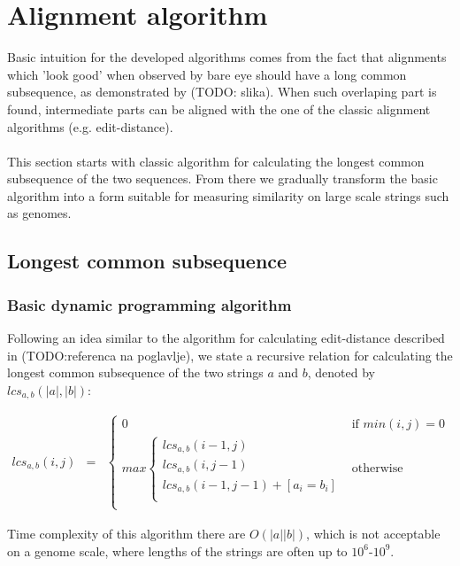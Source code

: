 \documentclass[times, utf8, diplomski]{fer}
\begin{document}
\section{Alignment algorithm}
Basic intuition for the developed algorithms comes from the fact that alignments which 'look good' when observed by bare eye should have a long common subsequence, as demonstrated by (TODO: slika). When such overlaping part is found, intermediate parts can be aligned with the one of the classic alignment algorithms (e.g. edit-distance).\\
\\
This section starts with classic algorithm for calculating the longest common subsequence of the two sequences. From there we gradually transform the basic algorithm into a form suitable for measuring similarity on large scale strings such as genomes.

\subsection{Longest common subsequence}

\subsubsection{Basic dynamic programming algorithm}

Following an idea similar to the algorithm for calculating edit-distance described in (TODO:referenca na poglavlje), we state a recursive relation for calculating the longest common subsequence of the two strings $a$ and $b$, denoted by $lcs_{a,b}(|a|,|b|)$:

\begin{eqnarray}
	\label{levenshtein}
	lcs_{a,b}\left(i,j\right) & = & 
							\left\{
								\begin{array}{ll}
								0 & \mbox{if } min(i,j) = 0\\	
								max\left\{
									\begin{array}{ll}
									lcs_{a,b}(i-1,j)\\	
									lcs_{a,b}(i,j-1)\\	
									lcs_{a,b}(i-1,j-1) + [a_i=b_i]\\	
									\end{array}
									\right.&\mbox{otherwise}\\
								\end{array}
							\right.
\end{eqnarray}

Time complexity of this algorithm there are $O(|a||b|)$, which is not acceptable on a genome scale, where lengths of the strings are often up to $10^6$-$10^9$.
\end{document}
